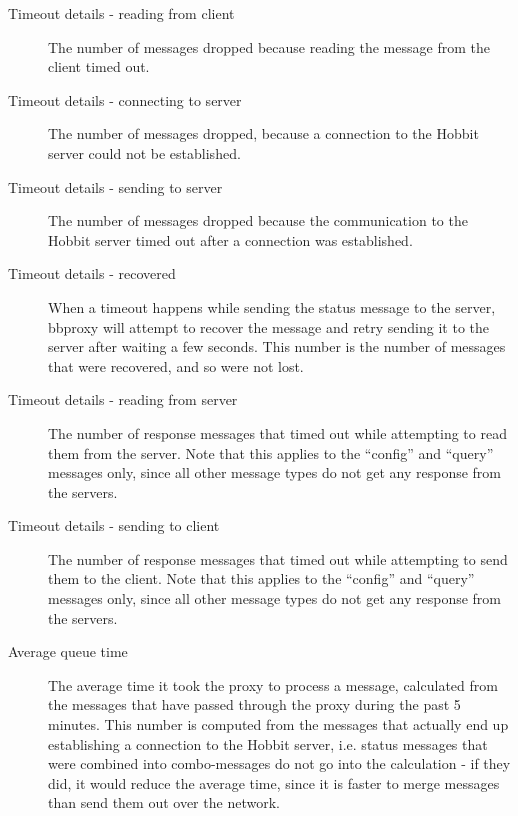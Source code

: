 \begin{description}
\item[Timeout details - reading from client] The number of messages dropped because reading the message from the client timed out. 

 

\item[Timeout details - connecting to server] The number of messages dropped, because a connection to the Hobbit server could not be established. 

 

\item[Timeout details - sending to server] The number of messages dropped because the communication to the Hobbit server timed out after a connection was established. 

 

\item[Timeout details - recovered] When a timeout happens while sending the status message to the server, bbproxy will attempt to recover the message and retry sending it to the server after waiting a few seconds. This number is the number of messages that were recovered, and so were not lost. 

 

\item[Timeout details - reading from server] The number of response messages that timed out while attempting to read them from the server. Note that this applies to the ``config'' and ``query'' messages only, since all other message types do not get any response from the servers. 

 

\item[Timeout details - sending to client] The number of response messages that timed out while attempting to send them to the client. Note that this applies to the ``config'' and ``query'' messages only, since all other message types do not get any response from the servers. 

 

\item[Average queue time] The average time it took the proxy to process a message, calculated from the messages that have passed through the proxy during the past 5 minutes. This number is computed from the messages that actually end up establishing a connection to the Hobbit server, i.e. status messages that were combined into combo-messages do not go into the calculation - if they did, it would reduce the average time, since it is faster to merge messages than send them out over the network. 

 


\end{description}

